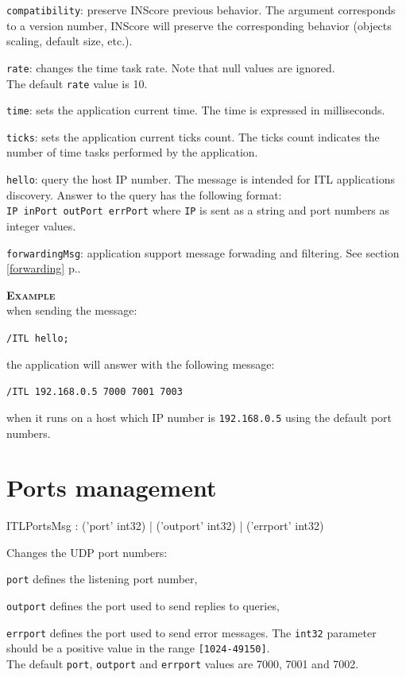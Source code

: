 \documentclass[a4paper,twoside]{report}
\newcommand{\sublevel}[1]	{\section{#1}}
\newcommand{\fullref}[1]	{\ref{#1} p.\pageref{#1}}
\newcommand{\OSC}[1]		{\texttt{#1}}
\newcommand{\values}[1]		{\texttt{#1}}
\newcommand{\oldexample}	{\hspace*{1cm}}
\newcommand{\example}		{\textbf{\hspace{-1.5cm}\textbf{\textsc{Example }}}}
\let\olditemize\itemize
\let\oldenditemize\enditemize
\renewenvironment{itemize} 	{\olditemize \setlength{\itemsep}{1mm}}{\oldenditemize}
\newcommand{\sample}	[1]			{\vspace{-2mm}\begin{center}\colorbox{mygrey}{
								\begin{minipage}[t]{0.9\columnwidth} 
								{\small \texttt{#1}}
								\end{minipage}}\end{center}}
\newcommand{\sampleindent}	{ \hspace{0.5cm} }
\begin{document}
\begin{itemize}
\item \OSC{compatibility}: preserve INScore previous behavior. The argument corresponds to a version number, INScore will preserve the corresponding behavior (objects scaling, default size, etc.).

\item \OSC{rate}: changes the time task rate. Note that null values are ignored.\\
The default \OSC{rate} value is 10.

\item \OSC{time}: sets the application current time. The time is expressed in milliseconds.

\item \OSC{ticks}: sets the application current ticks count. The ticks count indicates the number of time tasks performed by the application.

\item \OSC{hello}: query the host IP number. The message is intended for ITL applications discovery. Answer to the query has the following format: \\
\oldexample \OSC{IP  inPort outPort errPort} where \OSC{IP} is sent as a string and port numbers as integer values.

\item \OSC{forwardingMsg}: application support message forwading and filtering. See section \fullref{forwarding}.
\end{itemize}

\example \\
when sending the message:
\sample{/ITL hello;}
\sampleindent the application will answer with the following message:
\sample{/ITL 192.168.0.5  7000 7001 7003}
\sampleindent when it runs on a host which IP number is \OSC{192.168.0.5} using the default port numbers.

\sublevel{Ports management}
\label{ITLPorts}

\begin{rail}
ITLPortsMsg : ('port' int32)
		| ('outport' int32)
		| ('errport' int32)
\end{rail}

Changes the UDP port numbers:
\begin{itemize}
\item \OSC{port} defines the listening port number, 
\item \OSC{outport} defines the port used to send replies to queries, 
\item \OSC{errport} defines the port used to send error messages. 
\end{itemize}
The \OSC{int32} parameter should be a positive value in the range \values{[1024-49150]}. \\
The default \OSC{port}, \OSC{outport} and \OSC{errport} values are 7000, 7001 and 7002.
\end{document}
